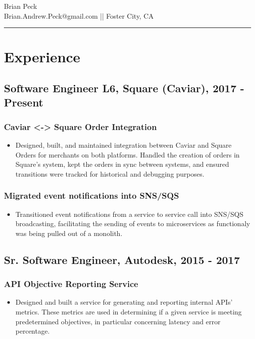 \documentclass[11pt]{article}
\title{}
\date{}
\begin{document}
\begin{center}
{\huge Brian Peck} \\
Brian.Andrew.Peck@gmail.com || Foster City, CA
\hrule
\end{center}

\section*{Experience}
\label{sec-1}
\subsection*{Software Engineer L6, Square (Caviar), 2017 - Present}
\label{sec-1-1}
\subsubsection*{Caviar <-> Square Order Integration}
\label{sec-1-2-1}

\begin{itemize}
\item Designed, built, and maintained integration between Caviar and Square Orders for merchants on both platforms. Handled the creation of orders in Square's system, kept the orders in sync between systems, and ensured transitions were tracked for historical and debugging purposes.
\end{itemize}

\subsubsection*{Migrated event notifications into SNS/SQS}
\label{sec-1-2-1}
\begin{itemize}
\item Transitioned event notifications from a service to service call into SNS/SQS broadcasting, facilitating the sending of events to microservices as functionaly was being pulled out of a monolith.
\end{itemize}

\subsection*{Sr. Software Engineer, Autodesk, 2015 - 2017}
\label{sec-1-2}
\subsubsection*{API Objective Reporting Service}
\label{sec-1-2-1}

\begin{itemize}
\item Designed and built a service for generating and reporting internal APIs' metrics. These metrics are used in determining if a given service is meeting predetermined objectives, in particular concerning latency and error percentage.
\end{itemize}
\end{document}
